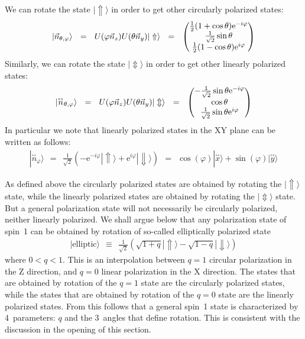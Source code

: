 \documentclass[onecolumn,fleqn]{revtex4}
\newcommand{\vecm}[1]{\overset{{}_{\leftrightarrow}}{#1}}
\newcommand{\eexp}{\mathrm{e}^}
\newcommand{\amatrix}[1]{\begin{matrix} #1 \end{matrix}}
\newcommand{\beq}{\begin{eqnarray}}
\newcommand{\eeq}{\end{eqnarray}}
\begin{document}
We can rotate the state ${| \Uparrow \rangle }$ 
in order to get other circularly polarized states:
\beq
|\vec{n}_{\theta,\varphi}\rangle 
\ \ = \ \ U( \varphi \vec{n}_z) U(\theta \vec{n}_y) | \Uparrow \rangle 
\ \ = \ \ \left( 
\amatrix{ 
\frac{1}{2}(1+\cos \theta) \eexp{-i \varphi} \cr 
\frac{1}{\sqrt{2}}\sin \theta \cr 
\frac{1}{2}(1-\cos \theta) \eexp{i \varphi} } 
\right) 
\eeq
Similarly, we can rotate the state ${| \Updownarrow \rangle }$ 
in order to get other linearly polarized states:
\beq
|\vecm{n}_{\theta,\varphi}\rangle
\ \ = \ \ U( \varphi \vec{n}_z) U(\theta \vec{n}_y) | \Updownarrow \rangle 
\ \ = \ \ \left(\amatrix{ 
-\frac{1}{\sqrt{2}}\sin \theta \eexp{-i \varphi} \cr 
\cos \theta \cr 
\frac{1}{\sqrt{2}}\sin \theta \eexp{i \varphi} } 
\right) 
\eeq
In particular we note that linearly polarized states in the XY plane 
can be written as follows:
\beq
|\vecm{n}_{\varphi}\rangle
\ \ = \ \ \frac{1}{\sqrt{2}}(- \eexp{-i \varphi} | \Uparrow \rangle + \eexp{i \varphi} | \Downarrow \rangle ) 
\ \ = \ \ \cos(\varphi) | \vecm{x} \rangle + \sin(\varphi) | \vecm{y} \rangle 
\eeq 



As defined above the circularly polarized states 
are obtained by rotating the ${| \Uparrow \rangle}$  
state, while the linearly polarized states are obtained 
by rotating the ${| \Updownarrow \rangle}$ state.
But a general polarization state will not necessarily 
be circularly polarized, neither linearly polarized.  
We shall argue below that any polarization state 
of spin~1 can be obtained by rotation of so-called
elliptically polarized state 
\beq
|\text{elliptic}\rangle \ \ \equiv \ \ \frac{1}{\sqrt{2}} \left(\sqrt{1+q}| \Uparrow \rangle - \sqrt{1-q}| \Downarrow \rangle \right)
\eeq
where $0<q<1$.
This is an interpolation between ${q=1}$ circular polarization in the Z direction, 
and ${q=0}$ linear polarization in the X direction.  
The states that are obtained by rotation of the $q=1$ state are the circularly polarized states, 
while the states that are obtained by rotation of the $q=0$ state are the linearly polarized states. 
From this follows that a general spin~1 state is 
characterized by 4~parameters: $q$ and the 3~angles
that define rotation.  This is consistent with the 
discussion in the opening of this section.
\end{document}
